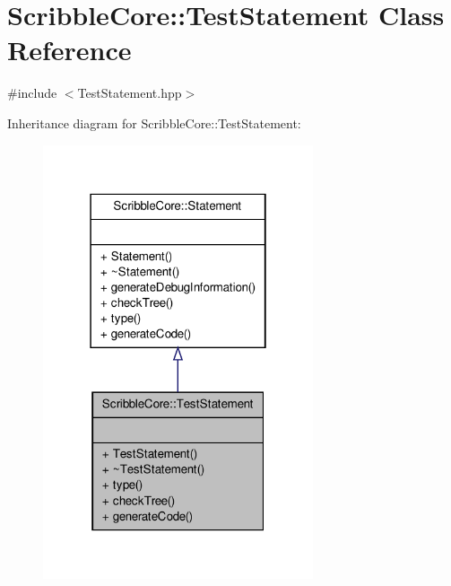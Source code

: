\hypertarget{class_scribble_core_1_1_test_statement}{\section{Scribble\-Core\-:\-:Test\-Statement Class Reference}
\label{class_scribble_core_1_1_test_statement}
}


{\ttfamily \#include $<$Test\-Statement.\-hpp$>$}



Inheritance diagram for Scribble\-Core\-:\-:Test\-Statement\-:
\nopagebreak
\begin{figure}[H]
\begin{center}
\leavevmode
\includegraphics[width=226pt]{class_scribble_core_1_1_test_statement__inherit__graph}
\end{center}
\end{figure}


